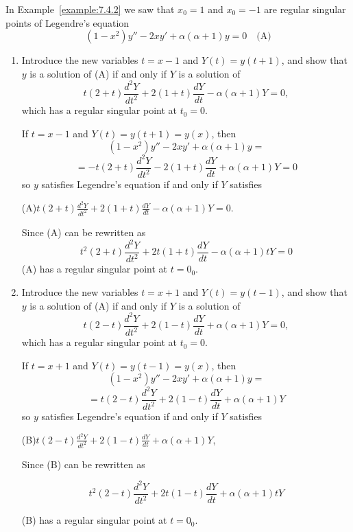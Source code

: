 \documentclass{ximera}
\begin{document}
\begin{problem}\label{exer:7.4.22}
In Example~\ref{example:7.4.2} we saw  that $x_0=1$ and $x_0=-1$
are regular singular points of Legendre's equation
$$
(1-x^2)y''-2xy'+\alpha(\alpha+1)y=0\quad
\text{(A)}
$$
\begin{enumerate}
\item %
Introduce the new variables $t=x-1$  and $Y(t)=y(t+1)$, and show that
$y$  is a solution of (A) if and only if
$Y$ is a solution of
$$
t(2+t)\frac{d^2Y}{ dt^2}+2(1+t)\frac{dY}{ dt}-\alpha(\alpha+1)Y=0,
$$
which has a regular singular point at $t_0=0$.

\begin{solution}
    If $t=x-1$ and $Y(t)=y(t+1)=y(x)$, then
$$(1-x^2)y''-2xy'+\alpha(\alpha+1)y=$$
$$=-t(2+t)\frac{d^2Y}{ dt^2}-2(1+t)\frac{dY}{ dt}+\alpha(\alpha+1)Y=0$$
so $y$ satisfies Legendre's equation if and only if $Y$ satisfies

(A)\quad $t(2+t)\frac{d^2Y}{ dt^2}+2(1+t)\frac{dY}{
dt}-\alpha(\alpha+1)Y=0$. 

Since (A) can be rewritten as
$$t^2(2+t)\frac{d^2Y}{ dt^2}+2t(1+t)\frac{dY}{
dt}-\alpha(\alpha+1)tY=0$$ (A) has a regular singular point at
$t=0_0$.

\end{solution}

\item %
Introduce the new variables $t=x+1$  and $Y(t)=y(t-1)$, and show that
$y$  is a solution of (A) if and only if
$Y$ is a solution of
$$
t(2-t)\frac{d^2Y}{ dt^2}+2(1-t)\frac{dY}{ dt}+\alpha(\alpha+1)Y=0,
$$
which has a regular singular point at $t_0=0$.

\begin{solution}
    If $t=x+1$ and $Y(t)=y(t-1)=y(x)$, then
$$(1-x^2)y''-2xy'+\alpha(\alpha+1)y=$$
$$=t(2-t)\frac{d^2Y}{ dt^2}+2(1-t)\frac{dY}{ dt}+\alpha(\alpha+1)Y$$
so $y$ satisfies Legendre's equation if and only if $Y$ satisfies

(B)\quad $t(2-t)\frac{d^2Y}{ dt^2}+2(1-t)\frac{dY}{
dt}+\alpha(\alpha+1)Y$,

 Since (B) can be rewritten as
 
$$t^2(2-t)\frac{d^2Y}{ dt^2}+2t(1-t)\frac{dY}{
dt}+\alpha(\alpha+1)tY$$

(B) has a regular singular point at
$t=0_0$.
\end{solution}
\end{enumerate}
\end{problem}
\end{document}
